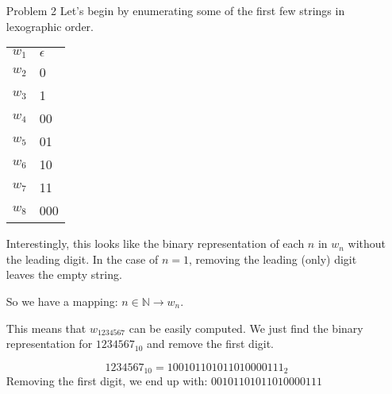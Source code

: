 \documentclass[12pt,letterpaper]{article}
\begin{document}
\begin{enumerate}
\begin{proof}
        Inductive Hypothesis:
        \[D_n = 9 \cdot 10^{\lfloor \frac{n-1}{2} \rfloor}\]

        Inductive Case:
        \begin{align*}
          D_{n+1} &= D_{n-1} \cdot 10 \\
          &= 9 \cdot 10^{\lfloor \frac{(n-1)-1}{2} \rfloor} \cdot 10 \\
          &= 9 \cdot 10^{\lfloor \frac{n-2}{2} \rfloor} \cdot 10 \\
          &= 9 \cdot 10^{\lfloor \frac{n}{2}-\frac{2}{2} \rfloor} \cdot 10 \\
          &= 9 \cdot 10^{\lfloor \frac{n}{2}-1 \rfloor} \cdot 10 \\
          &= 9 \cdot 10^{\lfloor \frac{n}{2}-1+1 \rfloor} \\
          &= 9 \cdot 10^{\lfloor \frac{n}{2} \rfloor} \\
        \end{align*}

        Thus, we have proved that our formula is correct.

      \end{proof}

      Now, we can calculate
      $D_{20} = 9 \cdot 10^{\lfloor \frac{20-1}{2} \rfloor} = 9 \cdot 10^9 = 9000000000$

    \item[Problem 2]
      Let's begin by enumerating some of the first few strings in lexographic order.

      \begin{tabular}{l | l}
        \hline
        $w_1$ & $\epsilon$ \\
        $w_2$ & 0 \\
        $w_3$ & 1 \\
        $w_4$ & 00 \\
        $w_5$ & 01 \\
        $w_6$ & 10 \\
        $w_7$ & 11 \\
        $w_8$ & 000
      \end{tabular}

      Interestingly, this looks like the binary representation of each $n$ in $w_n$ without the leading digit.
      In the case of $n = 1$, removing the leading (only) digit leaves the empty string.

      So we have a mapping: $n \in \mathbb{N} \rightarrow w_n$.

      This means that $w_{1234567}$ can be easily computed.
      We just find the binary representation for $1234567_{10}$ and remove the first digit.

      \[1234567_{10} = 100101101011010000111_2\]
      Removing the first digit, we end up with: $00101101011010000111$
  \end{enumerate}
\end{document}
